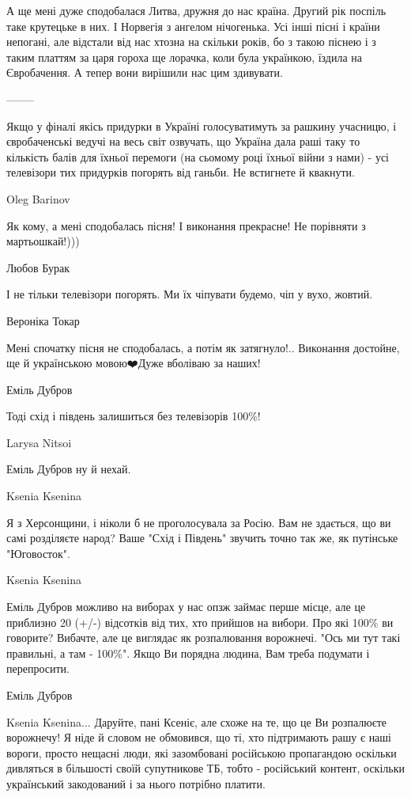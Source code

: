 А ще мені дуже сподобалася Литва, дружня до нас країна. Другий рік поспіль таке
крутецьке в них. І Норвегія з ангелом нічогенька. Усі інші пісні і країни
непогані, але відстали від нас хтозна на скільки років, бо з такою піснею і з
таким платтям за царя гороха ще лорачка, коли була українкою, їздила на
Євробачення. А тепер вони вирішили нас цим здивувати. 

--------

Якщо у фіналі якісь придурки в Україні голосуватимуть за рашкину учасницю, і
євробаченські ведучі на весь світ озвучать, що Україна дала раші таку то
кількість балів для їхньої перемоги (на сьомому році їхньої війни з нами) - усі
телевізори тих придурків погорять від ганьби. Не встигнете й квакнути.

Oleg Barinov

Як кому, а мені сподобалась пісня! І виконання прекрасне! Не порівняти з
мартьошкай!)))

Любов Бурак

І не тільки телевізори погорять. Ми їх чіпувати будемо, чіп у вухо, жовтий.

Вероніка Токар

Мені спочатку пісня не сподобалась, а потім як затягнуло!.. Виконання достойне,
ще й українською мовою❤️Дуже вболіваю за наших!

Еміль Дубров

Тоді схід і південь залишиться без телевізорів 100\%!

Larysa Nitsoi

Еміль Дубров ну й нехай.

Ksenia Ksenina

Я з Херсонщини, і ніколи б не проголосувала за Росію. Вам не здається, що ви
самі розділяєте народ? Ваше "Схід і Південь" звучить точно так же, як путінське
"Юговосток".

Ksenia Ksenina

Еміль Дубров можливо на виборах у нас опзж займає перше місце, але це приблизно
20 (+/-) відсотків від тих, хто прийшов на вибори. Про які 100\% ви говорите?
Вибачте, але це виглядає як розпалювання ворожнечі. "Ось ми тут такі правильні,
а там - 100\%". Якщо Ви порядна людина, Вам треба подумати і перепросити.

Еміль Дубров

Ksenia Ksenina... Даруйте, пані Ксеніє, але схоже на те, що це Ви розпалюєте
ворожнечу! Я ніде й словом не обмовився, що ті, хто підтримають рашу є наші
вороги, просто нещасні люди, які зазомбовані російською пропагандою оскільки
дивляться в більшості своїй супутникове ТБ, тобто - російський контент,
оскільки український закодований і за нього потрібно платити.

